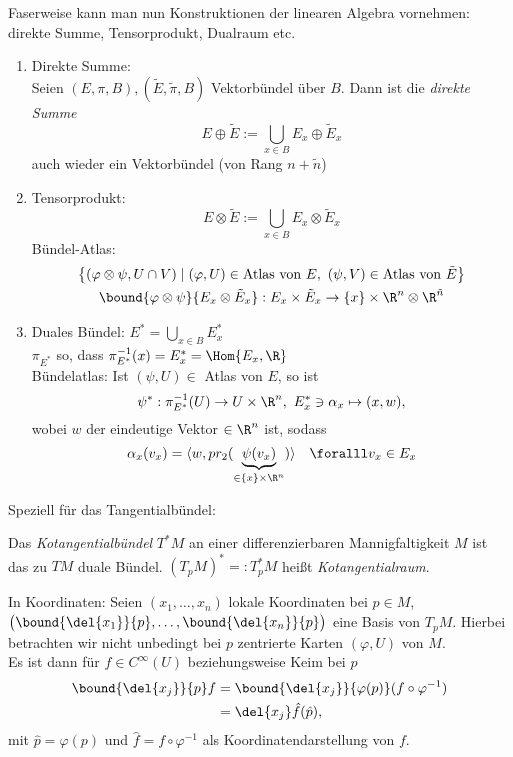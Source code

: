 \lecture Faserweise kann man nun Konstruktionen der linearen Algebra vornehmen: direkte Summe, Tensorprodukt, Dualraum etc.

\begin{exmp}\label{3.18}
	\begin{enumerate}[label={\roman*})]
		\item Direkte Summe:\\
			Seien $ (E,\pi,B),(\tilde{E},\tilde{\pi},B) $ Vektorbündel über $B$. Dann ist die \emph{direkte Summe}
			\[ E \oplus \tilde{E} := \bigcup_{x \in B} E_x \oplus \tilde{E}_x \]
			auch wieder ein Vektorbündel (von Rang $n + \tilde{n}$)
		\item Tensorprodukt:
			\[ E \otimes \tilde{E} := \bigcup_{x \in B} E_x \otimes \tilde{E}_x \]
		Bündel-Atlas:
			\begin{gather*}
				\big\{ (\varphi \otimes \psi, U \cap V) \mid (\varphi,U) \in \text{Atlas von }E,\ (\psi,V) \in \text{Atlas von } \tilde{E} \big\}\\
				\bound{\varphi \otimes \psi}{E_x \otimes \tilde{E}_x} : E_x \times \tilde{E}_x \to \{x\} \times \R^n \otimes \R^{\tilde{n}}
			\end{gather*}
		\item Duales Bündel: $ E^* = \bigcup_{x \in B} E_x^* $\\
			$ \pi_{E^*} $ so, dass $ \pi_{E^*}^{-1} (x) = E_x^* = \Hom{E_x,\R} $\\
			Bündelatlas: Ist $ (\psi,U) \in $ Atlas von $E$, so ist 
			$$ \psi^*: \pi_{E^*}^{-1} (U) \to U \times \R^n,\ E_x^* \ni \alpha_x \mapsto (x,w),$$
				wobei $w$ der eindeutige Vektor $\in \R^n$ ist, sodass
			\[ \alpha_x (v_x) = \langle w,pr_2(\underbrace{\psi(v_x)}_{\in \{x\} \times \R^n}) \rangle \quad \foralll v_x  \in E_x \]
	\end{enumerate}
\end{exmp}

Speziell für das Tangentialbündel:

\begin{defn}[Kotangentialbündel]
	Das \emph{Kotangentialbündel} $T^*M$ an einer differenzierbaren Mannigfaltigkeit $M$ ist das zu $TM$ duale Bündel. $ (T_pM)^* =: T_p^*M $ heißt \emph{Kotangentialraum}.
\end{defn}

In Koordinaten: Seien $ (x_1,\dotsc,x_n) $ lokale Koordinaten bei $p \in M$, $ \big( \bound{\del{x_1}}{p},\dotsc, \bound{\del{x_n}}{p} \big) $ eine Basis von $T_pM$. Hierbei betrachten wir nicht unbedingt bei $p$ zentrierte Karten $ (\varphi,U) $ von $M$.\\
Es ist dann für $f \in C^\infty(U)$ beziehungsweise Keim bei $p$
\begin{align*}
	\bound{\del{x_j}}{p}f &= \bound{\del{x_j}}{\varphi(p)} (f \circ \varphi^{-1})\\
	&= \del{x_j} \hat{f} (\hat{p}),
\end{align*}
mit $\hat{p} = \varphi(p)$ und $\hat{f} = f \circ \varphi^{-1}$ als Koordinatendarstellung von $f$.

